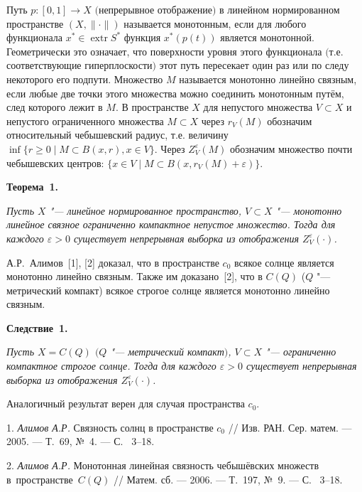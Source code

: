 \vzmscaption


Путь $p:[0,1]\rightarrow X$ $($непрерывное
отображение$)$ в линейном нормированном пространстве
$(X,\|\cdot\|)$ называется монотонным, если для любого функционала
$x^*\in\operatorname{extr}S^*$ функция $x^*(p(t))$ является
монотонной. Геометрически это означает, что поверхности уровня этого функционала $($т.е.
соответствующие гиперплоскости$)$ этот путь пересекает один раз или
по следу некоторого его подпути.
Множество $M$ называется монотонно линейно связным, если любые
две точки этого множества можно соединить монотонным путём, след
которого лежит в $M.$
В пространстве $X$ для непустого множества $V\subset X$ и непустого ограниченного множества $M\subset X$ через $r_V(M)$ обозначим относительный чебышевский радиус, т.е. величину $\inf\{r\geqslant 0\mid M\subset B(x,r), x\in V\}$. Через
 $Z_V^\varepsilon (M)$ обозначим множество почти чебышевских центров: $ \{x\in V\mid M\subset B(x,r_V(M)+\varepsilon)\}$.


\textbf{Теорема~1.} {\it Пусть $X$ "--- линейное нормированное пространство, $V\subset X$ "--- монотонно линейное связное ограниченно компактное непустое множество. Тогда для каждого $\varepsilon>0$ существует непрерывная выборка из отображения $Z_V^\varepsilon(\cdot)$.


}


А.Р.~Алимов~[1], [2] доказал, что в пространстве $c_0$ всякое солнце является монотонно линейно связным. Также им доказано~[2], что в $C(Q)$ ($Q$ "--- метрический компакт) всякое строгое солнце является монотонно линейно связным.




\textbf{Следствие~1.} {\it Пусть $X=C(Q) $ $(Q$ "--- метрический компакт$)$, $V\subset X$ "--- ограниченно компактное строгое солнце. Тогда для каждого $\varepsilon>0$ существует непрерывная выборка из отображения $Z_V^\varepsilon(\cdot)$.

}

Аналогичный результат верен для случая пространства $c_0$.

\litlist


1. {\it Алимов А.Р.} Связность солнц в пространстве $c_0$ // Изв. РАН. Сер. матем.
--- 2005. ---
Т.~69,
№~4. --- С.~ 3--18.

2. {\it Алимов А.Р.} Монотонная линейная связность
чебышёвских множеств в~пространстве~$C(Q)$ // Матем. сб.
--- 2006. ---
Т.~197,
№~9. --- С.~ 3--18.
